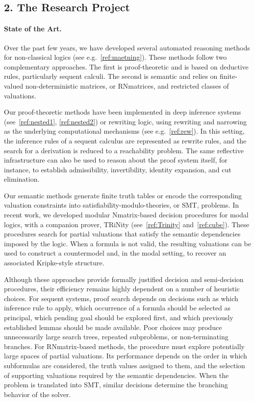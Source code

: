 \documentclass[a4paper]{article}
\newcommand{\TODO}[1]{{\color{red}TODO: #1}}
\begin{document}

\subsection*{2. The Research Project}

\paragraph{State of the Art.}
Over the past few years, we have developed several automated reasoning methods for non-classical logics (see e.g.~\ref{ref:maetning}). These methods follow two complementary approaches. The first is proof-theoretic and is based on deductive rules, particularly sequent calculi. The second is semantic and relies on finite-valued non-deterministic matrices, or RNmatrices, and restricted classes of valuations.

Our proof-theoretic methods have been implemented in deep inference systems (see~\ref{ref:nested1}, \ref{ref:nested2}) or rewriting logic, using rewriting and narrowing as the underlying computational mechanisms (see e.g.~\ref{ref:rew}). In this setting, the inference rules of a sequent calculus are represented as rewrite rules, and the search for a derivation is reduced to a reachability problem. The same reflective infrastructure can also be used to reason about the proof system itself, for instance, to establish admissibility, invertibility, identity expansion, and cut elimination.

Our semantic methods generate finite truth tables or encode the corresponding valuation constraints into satisfiability-modulo-theories, or SMT, problems. In recent work, we developed modular Nmatrix-based decision procedures for modal logics, with a companion prover, TRiNity (see~\ref{ref:Trinity} and~\ref{ref:cube}). These procedures search for partial valuations that satisfy the semantic dependencies imposed by the logic. When a formula is not valid, the resulting valuations can be used to construct a countermodel and, in the modal setting, to recover an associated Kripke-style structure.

Although these approaches provide formally justified decision and semi-decision procedures, their efficiency remains highly dependent on a number of heuristic choices.
%
For sequent systems, proof search depends on decisions such as which inference rule to apply, which occurrence of a formula should be selected as principal, which pending goal should be explored first, and which previously established lemmas should be made available. Poor choices may produce unnecessarily large search trees, repeated subproblems, or non-terminating branches.
%
For RNmatrix-based methods, the procedure must explore potentially large spaces of partial valuations. Its performance depends on the order in which subformulas are considered, the truth values assigned to them, and the selection of supporting valuations required by the semantic dependencies. When the problem is translated into SMT, similar decisions determine the branching behavior of the solver.
\end{document}

